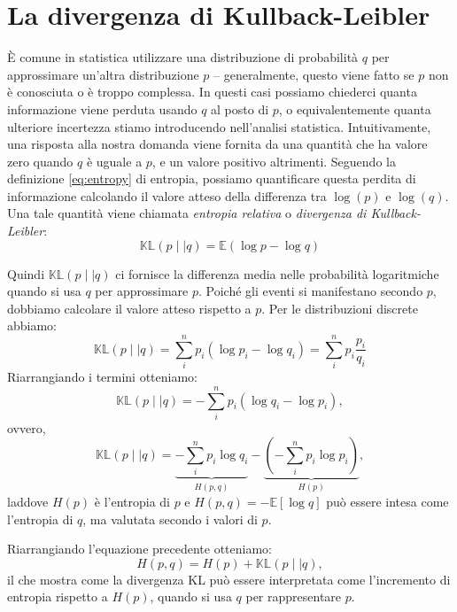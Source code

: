 \documentclass[
  10pt,
  italian,
  a4paper,
  extrafontsizes,onecolumn,openright
  ]{memoir}
\newcommand{\E}{\mathbb{E}} %
\theoremstyle{definition}
\theoremstyle{definition}
\theoremstyle{definition}
\theoremstyle{definition}
\theoremstyle{remark}
\begin{document}
\hypertarget{la-divergenza-di-kullback-leibler}{%
\section{La divergenza di Kullback-Leibler}\label{la-divergenza-di-kullback-leibler}}

È comune in statistica utilizzare una distribuzione di probabilità \(q\) per approssimare un'altra distribuzione \(p\) -- generalmente, questo viene fatto se \(p\) non è conosciuta o è troppo complessa. In questi casi possiamo chiederci quanta informazione viene perduta usando \(q\) al posto di \(p\), o equivalentemente quanta ulteriore incertezza stiamo introducendo nell'analisi statistica. Intuitivamente, una risposta alla nostra domanda viene fornita da una quantità che ha valore zero quando \(q\) è uguale a \(p\), e un valore positivo altrimenti. Seguendo la definizione \eqref{eq:entropy} di entropia, possiamo quantificare questa perdita di informazione calcolando il valore atteso della differenza tra \(\log(p)\) e \(\log(q)\). Una tale quantità viene chiamata \emph{entropia relativa} o \emph{divergenza di Kullback-Leibler}:
\begin{equation}
\mathbb{KL} (p \mid\mid q) = \E (\log p - \log q)
\label{eq:kldivergence}
\end{equation}

Quindi \(\mathbb{KL} (p \mid\mid q)\) ci fornisce la differenza media nelle probabilità logaritmiche quando si usa \(q\) per approssimare \(p\). Poiché gli eventi si manifestano secondo \(p\), dobbiamo calcolare il valore atteso rispetto a \(p\). Per le distribuzioni discrete abbiamo:
\begin{equation}
\mathbb{KL} (p \mid\mid q) = \sum_i^n p_i (\log p_i - \log q_i) = \sum_i^n p_i \frac{p_i}{q_i}
\end{equation}
Riarrangiando i termini otteniamo:
\begin{equation}
\mathbb{KL} (p \mid\mid q) = -\sum_i^n p_i (\log q_i - \log p_i),
\end{equation}
ovvero,
\begin{equation}
\mathbb{KL} (p \mid\mid q) = \underbrace{-\sum_i^n p_i \log q_i}_{H(p, q)} - \underbrace{\left(-\sum_i^n p_i \log p_i\right)}_{H(p)},
\end{equation}
laddove \(H(p)\) è l'entropia di \(p\) e \(H(p, q) = −\E [\log q]\) può essere intesa come l'entropia di \(q\), ma valutata secondo i valori di \(p\).

Riarrangiando l'equazione precedente otteniamo:
\begin{equation}
H(p, q) = H(p) + \mathbb{KL} (p \mid\mid q),
\end{equation}
il che mostra come la divergenza KL può essere interpretata come l'incremento di entropia rispetto a \(H(p)\), quando si usa \(q\) per rappresentare \(p\).
\end{document}
